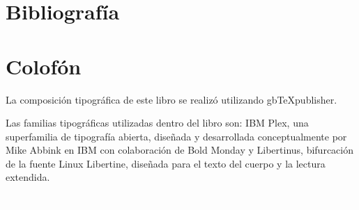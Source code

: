 			\chapter{Bibliografía}
			\printbibliography[heading=none]
			\fi
		\fi
	\fi
\fi





\ifPDF
\printindex[names]
\printindex[concepto]
\printindex[onomastico]
\else
	\ifBNPDF
	\printindex[names]
	\printindex[concepto]
	\printindex[onomastico]
	\fi
\fi

\chapter{Colofón}

La composición tipográfica de este libro se realizó utilizando gbTeXpublisher.

Las familias tipográficas utilizadas dentro del libro son: IBM Plex, una superfamilia de tipografía abierta, diseñada y desarrollada conceptualmente por Mike Abbink en IBM con colaboración de Bold Monday y Libertinus, bifurcación de la fuente Linux Libertine, diseñada para el texto del cuerpo y la lectura extendida.

\ifPDF
\newpage
\thispagestyle{empty}
{\textcolor{white}{.}}
\else
	\ifBNPDF
	\newpage
	\thispagestyle{empty}
	{\textcolor{white}{.}}
	\fi
\fi





